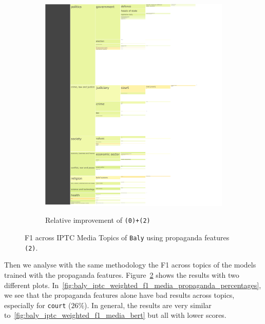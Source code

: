 \begin{figure}[!htbp]
\begin{subfigure}{0.49\textwidth}
    \href{https://martinomensio.github.io/phd-project/figures/baly_iptc_weighted_f1_media_delta.html}{\includegraphics[trim={2.65cm 0cm 0cm 0cm},clip,width=\linewidth]{figures/baly_iptc_weighted_f1_media_delta.pdf}}
    \caption{Relative improvement of \texttt{(0)+(2)}}
    \label{fig:baly_iptc_weighted_f1_media_delta}
\end{subfigure}
\caption{F1 across IPTC Media Topics of \texttt{Baly} using propaganda features \texttt{(2)}.}
    \label{fig:baly_iptc_weighted_f1_media_prop}
\end{figure}

Then we analyse with the same methodology the F1 across topics of the models trained with the propaganda features.
Figure~\ref{fig:baly_iptc_weighted_f1_media_prop} shows the results with two different plots. In~\ref{fig:baly_iptc_weighted_f1_media_propaganda_percentages}, we see that the propaganda features alone have bad results across topics, especially for \texttt{court} ($26\%$). In general, the results are very similar to~\ref{fig:baly_iptc_weighted_f1_media_bert} but all with lower scores.

